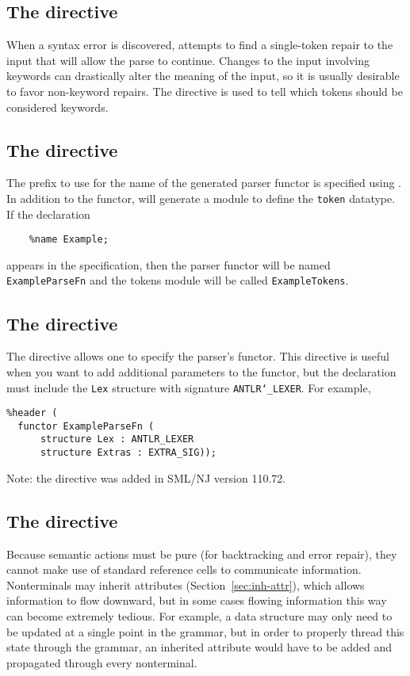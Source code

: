 \subsection{The  directive}

When a syntax error is discovered, \antlr{} attempts to find a single-token repair to the input that will allow the parse to continue.  Changes to the input involving keywords can drastically alter the meaning of the input, so it is usually desirable to favor non-keyword repairs.  The  directive is used to tell \antlr{} which tokens should be considered keywords.

\subsection{The  directive}

The prefix to use for the name of the generated parser functor is specified using .
In addition to the functor, \antlr{} will generate a module to define the \texttt{token} datatype.
If the declaration
\begin{verbatim}
    %name Example;
\end{verbatim}
appears in the specification, then the parser functor will be named
\texttt{ExampleParseFn} and the tokens module will be called \texttt{ExampleTokens}.

\subsection{The  directive}
The  directive allows one to specify the parser's functor.
This directive is useful when you want to add additional parameters to the functor,
but the declaration must include the \texttt{Lex} structure with signature
\texttt{ANTLR\char`\_LEXER}.
For example,
\begin{lstlisting}
%header (
  functor ExampleParseFn (
      structure Lex : ANTLR_LEXER
      structure Extras : EXTRA_SIG));
\end{lstlisting}%

Note: the  directive was added in SML/NJ version 110.72.

\subsection{The  directive}

Because semantic actions must be pure (for backtracking and error repair), they cannot make use of standard reference cells to communicate information.
Nonterminals may inherit attributes (Section~\ref{sec:inh-attr}), which allows information to flow downward, but in some cases flowing information this way can become extremely tedious.
For example, a data structure may only need to be updated at a single point in the grammar, but in order to properly thread this state through the grammar, an inherited attribute would have to be added and propagated through every nonterminal.


